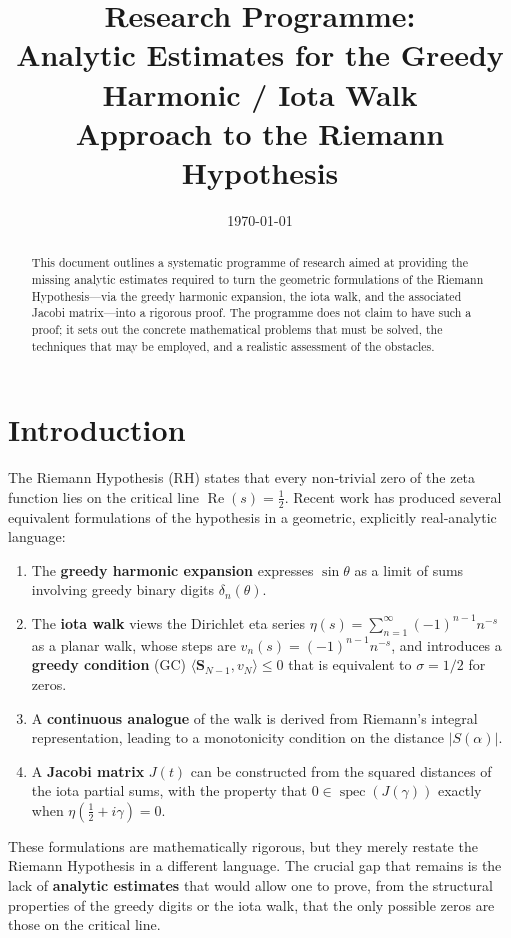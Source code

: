\documentclass[11pt,a4paper]{article}
\title{\bf Research Programme:\\
Analytic Estimates for the Greedy Harmonic / Iota Walk\\
Approach to the Riemann Hypothesis}
\author{}
\date{\today}
\begin{document}
\maketitle

\begin{abstract}
This document outlines a systematic programme of research aimed at providing the missing analytic estimates required to turn the geometric formulations of the Riemann Hypothesis—via the greedy harmonic expansion, the iota walk, and the associated Jacobi matrix—into a rigorous proof.  The programme does not claim to have such a proof; it sets out the concrete mathematical problems that must be solved, the techniques that may be employed, and a realistic assessment of the obstacles.
\end{abstract}

\section{Introduction}
The Riemann Hypothesis (RH) states that every non‑trivial zero of the zeta function lies on the critical line $\operatorname{Re}(s)=\frac12$.  Recent work has produced several equivalent formulations of the hypothesis in a geometric, explicitly real‑analytic language:

\begin{enumerate}[nosep]
    \item The \textbf{greedy harmonic expansion} expresses $\sin\theta$ as a limit of sums involving greedy binary digits $\delta_n(\theta)$.
    \item The \textbf{iota walk} views the Dirichlet eta series $\eta(s)=\sum_{n=1}^\infty (-1)^{n-1}n^{-s}$ as a planar walk, whose steps are $v_n(s)=(-1)^{n-1}n^{-s}$, and introduces a \textbf{greedy condition} (GC) $ \langle\mathbf{S}_{N-1},v_N\rangle \le 0$ that is equivalent to $\sigma=1/2$ for zeros.
    \item A \textbf{continuous analogue} of the walk is derived from Riemann's integral representation, leading to a monotonicity condition on the distance $|S(\alpha)|$.
    \item A \textbf{Jacobi matrix} $J(t)$ can be constructed from the squared distances of the iota partial sums, with the property that $0\in\operatorname{spec}(J(\gamma))$ exactly when $\eta(\frac12+i\gamma)=0$.
\end{enumerate}

These formulations are mathematically rigorous, but they merely restate the Riemann Hypothesis in a different language.  The crucial gap that remains is the lack of \textbf{analytic estimates} that would allow one to prove, from the structural properties of the greedy digits or the iota walk, that the only possible zeros are those on the critical line.
\end{document}

